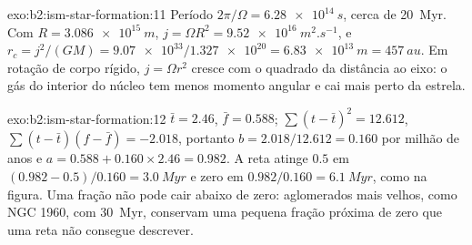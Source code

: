 \begin{solution}{exo:b2:ism-star-formation:11}
Período $2\pi/\Omega = \qty{6.28e14}{s}$, cerca de \qty{20}{Myr}. Com
$R = \qty{3.086e15}{m}$, $j = \Omega R^2 = \qty{9.52e16}{m^2.s^{-1}}$, e
$r_c = j^2/(GM) = \num{9.07e33}/\num{1.327e20} = \qty{6.83e13}{m} = \qty{457}{au}$.
Em rotação de corpo rígido, $j = \Omega r^2$ cresce com o quadrado da distância ao eixo:
o gás do interior do núcleo tem menos momento angular e cai mais perto da estrela.
\end{solution}

\begin{solution}{exo:b2:ism-star-formation:12}
$\bar t = 2.46$, $\bar f = 0.588$; $\sum(t - \bar t)^2 = 12.612$,
$\sum(t - \bar t)(f - \bar f) = -2.018$, portanto $b = 2.018/12.612 = 0.160$ por milhão
de anos e $a = 0.588 + 0.160\times2.46 = 0.982$. A reta atinge $0.5$ em
$(0.982 - 0.5)/0.160 = \qty{3.0}{Myr}$ e zero em $0.982/0.160 = \qty{6.1}{Myr}$, como na
figura. Uma fração não pode cair abaixo de zero: aglomerados mais velhos, como NGC 1960, com
\qty{30}{Myr}, conservam uma pequena fração próxima de zero que uma reta não consegue descrever.
\end{solution}

